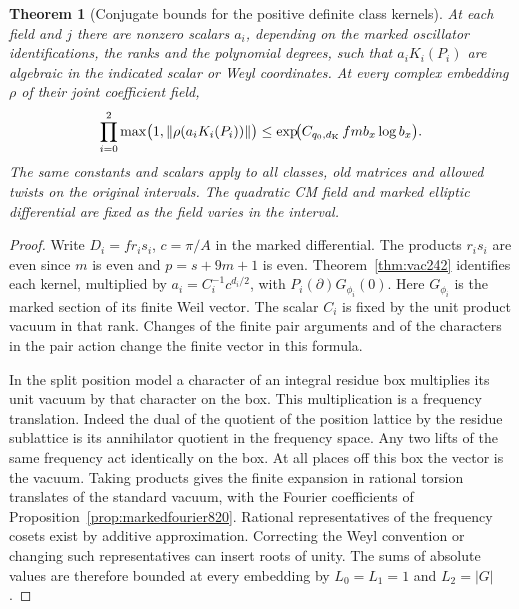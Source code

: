 \documentclass[a4paper,11pt]{article}
\newtheorem{theorem}[proposition]{Theorem}
\theoremstyle{definition}
\theoremstyle{remark}
\numberwithin{equation}{section}
\begin{document}
\begin{theorem}[Conjugate bounds for the positive definite class kernels]
\leavevmode\label{thm:markeddefinite820}
At each field and \(j\) there are nonzero scalars \(a_i\),
depending on the marked oscillator identifications, the ranks
and the polynomial degrees, such that \(a_i K_i(P_i)\) are
algebraic in the indicated scalar or Weyl coordinates. At
every complex embedding \(\rho\) of their joint coefficient
field,
\[
 \prod_{i=0}^2\max\bigl(1,\|\rho(a_i K_i(P_i))\|\bigr)
      \le \exp\!\bigl(C_{q_0,d_{\rm K}}\,f m b_x\log b_x\bigr).
\]
The same constants and scalars apply to all classes, old matrices
and allowed twists on the original intervals. The quadratic CM
field and marked elliptic differential are fixed as the
field varies in the interval.
\end{theorem}
\begin{proof}
Write \(D_i=fr_is_i\), \(c=\pi/A\) in the marked differential.
The products \(r_is_i\) are even since \(m\) is even and
\(p=s+9m+1\) is even. Theorem~\ref{thm:vac242} identifies each
kernel, multiplied by \(a_i=C_i^{-1}c^{d_i/2}\), with
\(P_i(\partial)G_{\phi_i}(0)\). Here \(G_{\phi_i}\) is the
marked section of its finite Weil vector. The scalar \(C_i\)
is fixed by the unit product vacuum in that rank. Changes of
the finite pair arguments and of the characters in the pair
action change the finite vector in this formula.

In the split position model a character of an integral residue
box multiplies its unit vacuum by that character on the box.
This multiplication is a frequency translation. Indeed the
dual of the quotient of the position lattice by the residue
sublattice is its annihilator quotient in the frequency space.
Any two lifts of the same frequency act identically on the box.
At all places off this box the vector is the vacuum. Taking
products gives the finite expansion in rational torsion
translates of the standard vacuum, with the Fourier coefficients
of Proposition~\ref{prop:markedfourier820}. Rational representatives
of the frequency cosets exist by additive approximation. Correcting
the Weyl convention or changing such representatives can insert
roots of unity. The sums of absolute values are therefore bounded
at every embedding by \(L_0=L_1=1\) and \(L_2=|G|\).


\end{proof}
\end{document}
